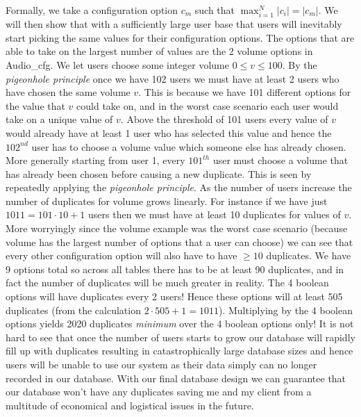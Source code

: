 Formally, we
take a configuration option $c_m$ such that
$\max_{i=1}^{N} |c_i| = |c_m|$. We will then show that with a
sufficiently large user base that users will inevitably start
picking the same values for their configuration options. The
options that are able to take on the largest number of values
are the 2 volume options in {\sffamily Audio\_cfg}. We let
users choose some integer volume $0 \leq v \leq 100$. By the
\textit{pigeonhole principle} once we have 102 users we
must have at least 2 users who have chosen the same
volume $v$. This is because we have 101 different options for
the value that $v$ could take on, and in the worst case
scenario each user would take on a unique value of $v$. Above
the threshold of 101 users every value of $v$ would already
have at least 1 user who has selected this value and hence the
$102^{nd}$ user has to choose a volume value which someone else
has already chosen. More generally starting from user 1, every
$101^{th}$ user must choose a volume that has already been
chosen before causing a new duplicate. This is seen by
repeatedly applying the \textit{pigeonhole principle}. As the
number of users increase the number of duplicates for volume
grows linearly. For instance if we have just
$1011 = 101 \cdot 10 + 1$ users then we must
have at least 10 duplicates for values of $v$. More worryingly
since the volume example was the worst case scenario (because
volume has the largest number of options that a user can
choose) we can see that every other configuration option will
also have to have $\geq 10$ duplicates. We have 9 options
total so across all tables there has to be at least 90
duplicates, and in fact the number of duplicates will be much
greater in reality. The 4 boolean options will have
duplicates every 2 users! Hence these options will at least
505 duplicates (from the calculation $2 \cdot 505 + 1 = 1011$).
Multiplying by the 4 boolean options yields 2020 duplicates
\textit{minimum} over the 4 boolean options only! It is not
hard to see that once the number of users starts to grow our
database will rapidly fill up with duplicates resulting in
catastrophically large database sizes and hence users will be
unable to use our system as their data simply can no longer
recorded in our database. With our final database design we
can guarantee that our database won't have any duplicates
saving me and my client from a multitude of economical and
logistical issues in the future. \\ \vspace{0.2cm}

